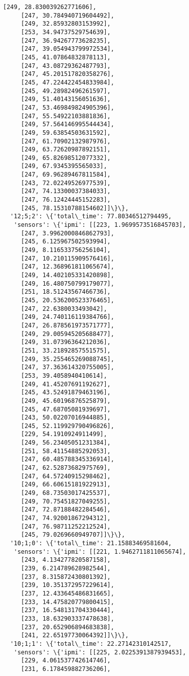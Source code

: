 \documentclass[11pt]{article}
\begin{document}
\begin{tcolorbox}[breakable, size=fbox, boxrule=.5pt, pad at break*=1mm, opacityfill=0]
\begin{Verbatim}[commandchars=\\\{\}]
     [249, 28.830039262771606],
     [247, 30.784940719604492],
     [249, 32.85932803153992],
     [253, 34.94737529754639],
     [247, 36.94267773628235],
     [247, 39.054943799972534],
     [245, 41.07864832878113],
     [247, 43.08729362487793],
     [247, 45.201517820358276],
     [245, 47.224422454833984],
     [245, 49.28982496261597],
     [249, 51.40143156051636],
     [247, 53.469849824905396],
     [247, 55.54922103881836],
     [249, 57.564146995544434],
     [249, 59.63854503631592],
     [247, 61.70902132987976],
     [249, 63.72620987892151],
     [249, 65.82698512077332],
     [249, 67.9345395565033],
     [247, 69.96289467811584],
     [243, 72.02249526977539],
     [247, 74.13300037384033],
     [247, 76.12424445152283],
     [245, 78.15310788154602]]\}\},
  '12;5;2': \{'total\_time': 77.80346512794495,
   'sensors': \{'ipmi': [[223, 1.9699573516845703],
     [247, 3.9962000846862793],
     [245, 6.125967502593994],
     [249, 8.116533756256104],
     [247, 10.210115909576416],
     [247, 12.368961811065674],
     [249, 14.402105331420898],
     [249, 16.480750799179077],
     [251, 18.51243567466736],
     [245, 20.536200523376465],
     [247, 22.6380033493042],
     [249, 24.740116119384766],
     [247, 26.878561973571777],
     [249, 29.005945205688477],
     [249, 31.07396364212036],
     [251, 33.21892857551575],
     [249, 35.255465269088745],
     [247, 37.363614320755005],
     [253, 39.4058940410614],
     [249, 41.45207691192627],
     [245, 43.52491879463196],
     [249, 45.60196876525879],
     [245, 47.68705081939697],
     [243, 50.02207016944885],
     [245, 52.119929790496826],
     [229, 54.1910924911499],
     [249, 56.23405051231384],
     [251, 58.41154885292053],
     [247, 60.485788345336914],
     [247, 62.52873682975769],
     [247, 64.57240915298462],
     [249, 66.60615181922913],
     [249, 68.73503017425537],
     [249, 70.75451827049255],
     [247, 72.87188482284546],
     [247, 74.92001867294312],
     [247, 76.98711252212524],
     [245, 79.0269660949707]]\}\},
  '10;1;0': \{'total\_time': 21.15883469581604,
   'sensors': \{'ipmi': [[221, 1.9462711811065674],
     [243, 4.134277820587158],
     [239, 6.214789628982544],
     [237, 8.315872430801392],
     [239, 10.351372957229614],
     [237, 12.433645486831665],
     [233, 14.475820779800415],
     [237, 16.548131704330444],
     [233, 18.632903337478638],
     [237, 20.652906894683838],
     [241, 22.65197730064392]]\}\},
  '10;1;1': \{'total\_time': 22.27142310142517,
   'sensors': \{'ipmi': [[225, 2.0225391387939453],
     [229, 4.061537742614746],
     [231, 6.178459882736206],

\end{Verbatim}
\end{tcolorbox}
\end{document}
